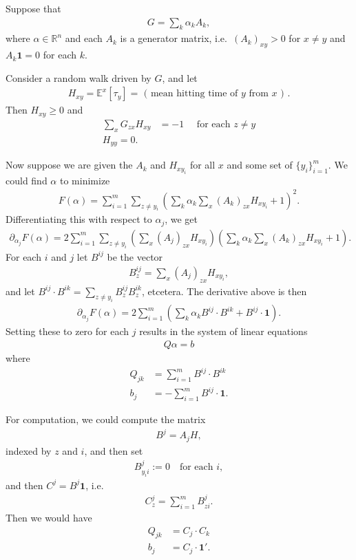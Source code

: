 \documentclass{article}
\newcommand{\R}{\mathbb{R}}
\newcommand{\E}{\mathbb{E}}
\newcommand{\bone}{\mathbf{1}}
\begin{document}
Suppose that 
\begin{align}
  G = \sum_k \alpha_k A_k,
\end{align}
where $\alpha \in \R^n$
and each $A_k$ is a generator matrix,
i.e.\ $(A_k)_{xy} > 0$ for $x\neq y$ and $A_k \bone = 0$ for each $k$.

Consider a random walk driven by $G$, and let
\begin{align}
  H_{xy} = \E^x[\tau_y] = \text{ ( mean hitting time of $y$ from $x$ ) } .
\end{align}
Then  $H_{xy} \ge 0$ and
\begin{align}
  \sum_x G_{zx} H_{xy} &= -1 \quad \text{ for each } z \neq y \\
        H_{yy} = 0 .
\end{align}

Now suppose we are given the $A_k$ and $H_{xy_i}$ for all $x$ and some set of $\{y_i\}_{i=1}^m$.
We could find $\alpha$ to minimize
\begin{align}
  F(\alpha) = \sum_{i=1}^m \sum_{z \neq y_i} \left( \sum_k \alpha_k \sum_x (A_k)_{zx} H_{xy_i} + 1 \right)^2 .
\end{align}
Differentiating this with respect to $\alpha_j$,
we get
\begin{align}
  \partial_{\alpha_j} F(\alpha) = 2 \sum_{i=1}^m \sum_{z \neq y_i} \left( \sum_x (A_j)_{zx} H_{xy_i} \right) \left( \sum_k \alpha_k \sum_x (A_k)_{zx} H_{xy_i} + 1 \right) .
\end{align}
For each $i$ and $j$ let $B^{ij}$ be the vector
\begin{align}
  B^{ij}_z = \sum_x (A_j)_{zx} H_{xy_i} ,
\end{align}
and let $B^{ij} \cdot B^{ik} = \sum_{z \neq y_i} B^{ij}_z B^{ik}_z$, etcetera.
The derivative above is then
\begin{align}
  \partial_{\alpha_j} F(\alpha) = 2 \sum_{i=1}^m \left( \sum_k \alpha_k B^{ij} \cdot B^{ik} + B^{ij} \cdot \bone \right) .
\end{align}
Setting these to zero for each $j$ results in the system of linear equations
\begin{align}
  Q \alpha = b
\end{align}
where
\begin{align}
    Q_{jk} &= \sum_{i=1}^m  B^{ij} \cdot B^{ik} \\
    b_j &= - \sum_{i=1}^m  B^{ij} \cdot \bone .
\end{align}

For computation, we could compute the matrix
\begin{align}
  B^j = A_j H ,
\end{align}
indexed by $z$ and $i$,
and then set
\begin{align}
  B^j_{y_i i} := 0 \quad \text{for each } i ,
\end{align}
and then $C^j = B^j \bone$, i.e.
\begin{align}
  C^j_z = \sum_{i=1}^m B^j_{z i} .
\end{align}
Then we would have
\begin{align}
    Q_{jk} &= C_j \cdot C_k \\
    b_j &= C_j \cdot \bone' .
\end{align}
\end{document}
